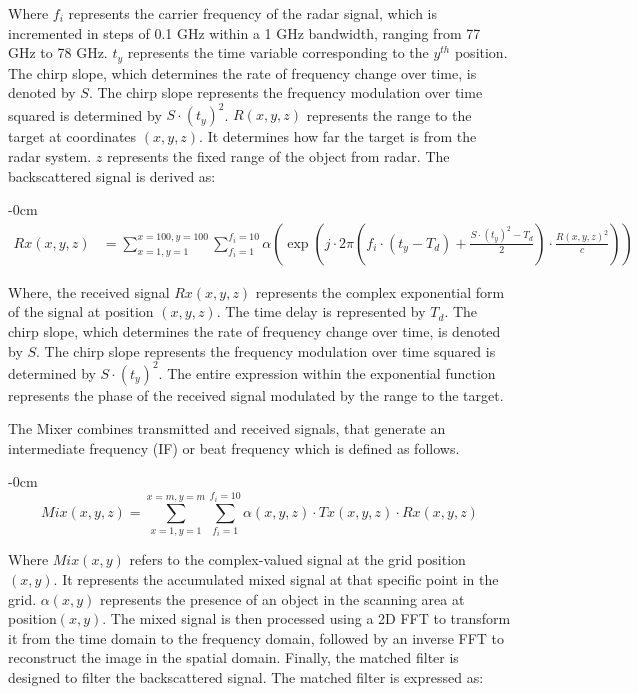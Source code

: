 \documentclass[journal,article,submit,pdftex,moreauthors]{Definitions/mdpi}
\begin{document}
\noindent Where \(f_i\) represents the carrier frequency of the radar signal, which is incremented in steps of 0.1 GHz within a 1 GHz bandwidth, ranging from 77 GHz to 78 GHz. \(t_y\) represents the time variable corresponding to the \(y^{th}\) position. The chirp slope, which determines the rate of frequency change over time, is denoted by \(S\).  The chirp slope represents the frequency modulation over time squared is determined by \(S\cdot (t_y)^2\). \(R(x,y,z)\) represents the range to the target at coordinates \((x,y,z)\). It determines how far the target is from the radar system. \(z\) represents the fixed range of the object from radar. The backscattered signal is derived as:

\begin{adjustwidth}{-\extralength}{0cm}
\begin{equation}
   \begin{aligned}
        Rx(x, y, z) &= \sum_{x=1, y=1}^{x=100, y=100} \sum_{f_i=1}^{f_i=10} \alpha \left( \exp \left( j \cdot 2 \pi \left( f_i \cdot \left( t_y - T_d \right) + \frac{S \cdot (t_y)^2 - T_d}{2} \right) \cdot \frac{R(x, y, z)^2}{c} \right) \right)
   \end{aligned}
\end{equation}
\end{adjustwidth}

\noindent Where, the received signal \( Rx(x, y, z) \) represents the complex exponential form of the signal at position \( (x, y, z) \). The time delay is represented by \( T_d \). The chirp slope, which determines the rate of frequency change over time, is denoted by \(S\).  The chirp slope represents the frequency modulation over time squared is determined by \(S\cdot (t_y)^2\). The entire expression within the exponential function represents the phase of the received signal modulated by the range to the target.

The Mixer combines transmitted and received signals, that generate an intermediate frequency (IF) or beat frequency which is defined as follows. 

\begin{adjustwidth}{-\extralength}{0cm}
\begin{equation}
   {Mix}(x, y, z) = \sum_{x=1, y=1}^{x=m, y=m} \sum_{f_i=1}^{f_i=10} \alpha (x, y, z) \cdot {Tx}(x, y, z) \cdot {Rx}(x, y, z)
\end{equation}
\end{adjustwidth}



\noindent Where \(Mix(x,y)\) refers to the complex-valued signal at the grid position \((x,y)\). It represents the accumulated mixed signal at that specific point in the grid. \(\text{$\alpha$} (x,y)\) represents the presence of an object in the scanning area at position\((x,y)\). The mixed signal is then processed using a 2D FFT to transform it from the time domain to the frequency domain, followed by an inverse FFT to reconstruct the image in the spatial domain. Finally, the matched filter is designed to filter the backscattered signal. The matched filter is expressed as:
\end{document}
